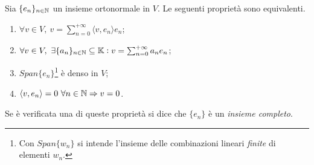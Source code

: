 \begin{proposition}
    Sia $ \{e_n\}_{n \in \mathbb{N}} $ un insieme ortonormale in $ V $. Le seguenti proprietà sono equivalenti. 
    \begin{enumerate}[label=(\roman*)]
        \item $ \forall v \in V, \ v = \sum_{n = 0}^{+\infty} {\langle v, e_n \rangle} e_n $;
        \item $ \forall v \in V, \ \exists \{a_n\}_{n \in \mathbb{N}} \subseteq \mathbb{K} : v = \sum_{n = 0}^{+\infty} a_n e_n $;
        \item $ Span{\{e_n\}} $\footnote{Con $ Span{\{w_n\}} $ si intende l'insieme delle combinazioni lineari \emph{finite} di elementi $ w_n $.} è denso in $ V $;
        \item $ {\langle v, e_n \rangle} = 0 \ \forall n \in \mathbb{N} \Rightarrow v = 0 $.
    \end{enumerate}
    Se è verificata una di queste proprietà si dice che $ \{e_n\} $ è un \emph{insieme completo}. 
\end{proposition}
